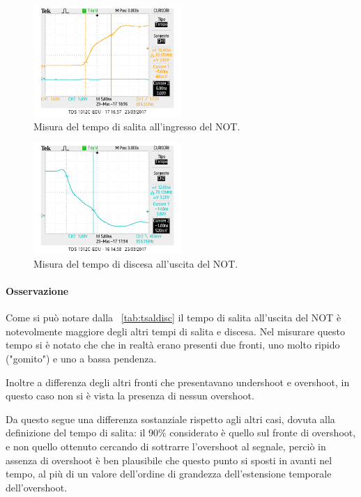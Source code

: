 \documentclass[a4paper,10pt]{article}
\begin{document}
{\begin{figure}[H]
	\centering
	\includegraphics[width=0.5\textwidth]{../grafici/temposalita1input.png}
	\caption{Misura del tempo di salita all'ingresso del NOT.}
	\label{fig:temposalita1input}
\end{figure}

\begin{figure}[H]
	\centering
	\includegraphics[width=0.5\textwidth]{../grafici/tempodiscesa.png}
	\caption{Misura del tempo di discesa all'uscita del NOT.}
	\label{fig:tempodiscesa}
\end{figure}

\paragraph{Osservazione}
Come si può notare dalla \tablename{~\ref{tab:tsaldisc}} il tempo di salita all'uscita del NOT è notevolmente maggiore degli altri tempi di salita e discesa.
Nel misurare questo tempo si è notato che che in realtà erano presenti due fronti, uno molto ripido ("gomito") e uno a bassa pendenza.

Inoltre a differenza degli altri fronti che presentavano undershoot e overshoot, in questo caso non si è vista la presenza di nessun overshoot. 

Da questo segue una differenza sostanziale rispetto agli altri casi, dovuta alla definizione del tempo di salita: il $90\%$ considerato è quello sul fronte di overshoot, e non quello ottenuto cercando di sottrarre l'overshoot al segnale, perciò in assenza di overshoot è ben plausibile che questo punto si sposti in avanti nel tempo, al più di un valore dell'ordine di grandezza dell'estensione temporale dell'overshoot.

}
\end{document}

